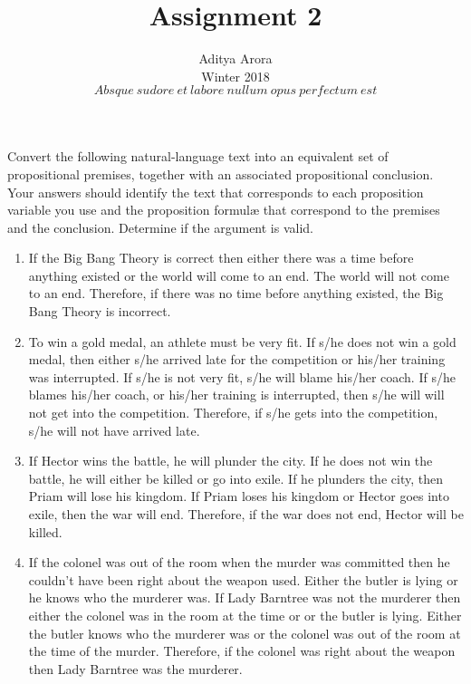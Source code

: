 \documentclass[12pt]{article}
\newenvironment{problem}[2][Problem]{\begin{trivlist}
\item[\hskip \labelsep {\bfseries #1}\hskip \labelsep {\bfseries #2.}]}{\end{trivlist}}
\begin{document}

\title{Assignment 2}%
\author{Aditya Arora\\ %
Winter 2018\\$Absque\ sudore\ et\ labore\ nullum\ opus\ perfectum\ est$} %
\maketitle

\begin{problem}{1}
Convert the following natural-language text into an equivalent set of propositional premises, together with an associated propositional conclusion.  Your answers should identify the text that corresponds to each proposition variable you use and the proposition formul{\ae} that correspond to the premises and the conclusion.  Determine if the argument is valid.
\begin{enumerate}
  \parskip=0in
  \parsep=0in
  \itemsep=0in
\item If the Big Bang Theory is correct then either there was a time before anything existed or the world will come to an end.  The world will not come to an end.  Therefore, if there was no time before anything existed, the Big Bang Theory is incorrect.
\item To win a gold medal, an athlete must be very fit.  If s/he does not win a gold medal, then either s/he arrived late for the competition or his/her training was interrupted.  If s/he is not very fit, s/he will blame his/her coach.  If s/he blames his/her coach, or his/her training is interrupted, then s/he will will not get into the competition.  Therefore, if s/he gets into the competition, s/he will not have arrived late.
\item If Hector wins the battle, he will plunder the city.  If he does not win the battle, he will either be killed or go into exile.  If he plunders the city, then Priam will lose his kingdom.  If Priam loses his kingdom or Hector goes into exile, then the war will end.  Therefore, if the war does not end, Hector will be killed.
\item If the colonel was out of the room when the murder was committed then he couldn't have been right about the weapon used.  Either the butler is lying or he knows who the murderer was.  If Lady Barntree was not the murderer then either the colonel was in the room at the time or or the butler is lying.  Either the butler knows who the murderer was or the colonel was out of the room at the time of the murder.  Therefore, if the colonel was right about the weapon then Lady Barntree was the murderer.
\end{enumerate}
\end{problem}
\end{document}

